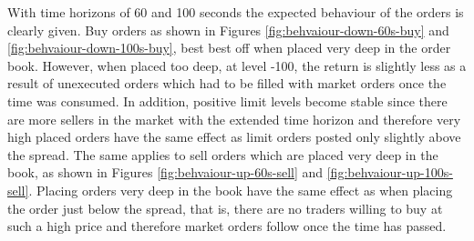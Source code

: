 With time horizons of 60 and 100 seconds the expected behaviour of the orders is clearly given.
Buy orders as shown in Figures \ref{fig:behvaiour-down-60s-buy} and \ref{fig:behvaiour-down-100s-buy}, best best off when placed very deep in the order book.
However, when placed too deep, at level -100, the return is slightly less as a result of unexecuted orders which had to be filled with market orders once the time was consumed.
In addition, positive limit levels become stable since there are more sellers in the market with the extended time horizon and therefore very high placed orders have the same effect as limit orders posted only slightly above the spread.
The same applies to sell orders which are placed very deep in the book, as shown in Figures \ref{fig:behvaiour-up-60s-sell} and \ref{fig:behvaiour-up-100s-sell}.
Placing orders very deep in the book have the same effect as when placing the order just below the spread, that is, there are no traders willing to buy at such a high price and therefore market orders follow once the time has passed.
\vfill
\newpage
